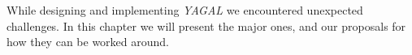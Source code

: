 While designing and implementing \textit{YAGAL} we encountered unexpected challenges. In this chapter we will present the major ones, and our proposals for how they can be worked around.
